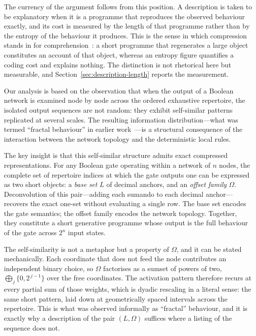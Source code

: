 \documentclass[11pt]{article}
\begin{document}
The currency of the argument follows from this position.  A description is
taken to be explanatory when it is a programme that reproduces the observed
behaviour exactly, and its cost is measured by the length of that programme
rather than by the entropy of the behaviour it produces.  This is the sense
in which compression stands in for comprehension~\cite{zenilcomprehension}:
a short programme that regenerates a large object constitutes an account of
that object, whereas an entropy figure quantifies a coding cost and
explains nothing.  The distinction is not rhetorical here but measurable,
and Section~\ref{sec:description-length} reports the measurement.

Our analysis is based on the observation that when the
output of a Boolean network is examined node by node across the
ordered exhaustive repertoire, the isolated output sequences are not
random: they exhibit self-similar patterns replicated at several scales.  The
resulting information distribution---what was termed ``fractal behaviour''
in earlier work~\cite{hernandez2019}---is a structural consequence of the
interaction between the network topology and the deterministic local
rules.

The key insight is that this self-similar structure admits exact
compressed representations.  For any Boolean gate operating within a
network of $n$ nodes, the complete set of repertoire indices at which
the gate outputs one can be expressed as two short objects: a \emph{base
set} $L$ of decimal anchors, and an \emph{offset family} $\Omega$.
Deconvolution of this pair---adding each sumando to each decimal anchor---recovers
the exact one-set without evaluating a single row.  The base set
encodes the gate semantics; the offset family encodes the network
topology.  Together, they constitute a short generative programme whose
output is the full behaviour of the gate across $2^n$ input states.

The self-similarity is not a metaphor but a property of $\Omega$, and it can
be stated mechanically.  Each coordinate that does not feed the node
contributes an independent binary choice, so $\Omega$ factorises as a sumset
of powers of two, $\bigoplus_j\{0,2^{\,j-1}\}$ over the free coordinates.  The
activation pattern therefore recurs at every partial sum of those weights,
which is dyadic rescaling in a literal sense: the same short pattern, laid
down at geometrically spaced intervals across the repertoire.  This is what
was observed informally as ``fractal'' behaviour, and it is exactly why a
description of the pair $(L,\Omega)$ suffices where a listing of the sequence
does not.
\end{document}
